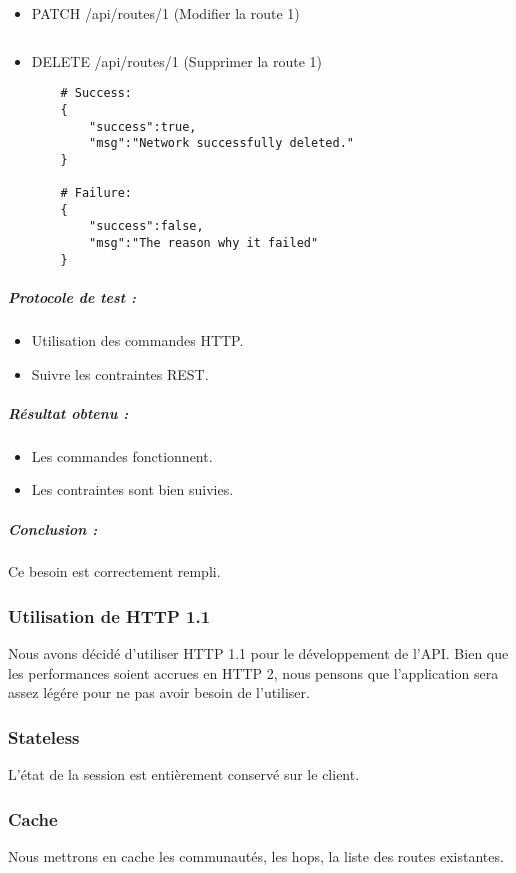 \begin{itemize}
    \item PATCH /api/routes/1 (Modifier la route 1)
    \begin{verbatim}
    \end{verbatim}

    \item DELETE /api/routes/1 (Supprimer la route 1)
    \begin{verbatim}
    # Success:
    {
        "success":true,
        "msg":"Network successfully deleted."
    }

    # Failure:
    {
        "success":false,
        "msg":"The reason why it failed"
    }
    \end{verbatim}

\end{itemize}

\subparagraph{Protocole de test :}
\begin{itemize}
    \item Utilisation des commandes HTTP.
    \item Suivre les contraintes REST.
\end{itemize}
\subparagraph{Résultat obtenu :}
    \begin{itemize}
    \item Les commandes fonctionnent.
    \item Les contraintes sont bien suivies.
\end{itemize}
\subparagraph{Conclusion :}Ce besoin est correctement rempli.

\subsubsection{Utilisation de HTTP 1.1}
Nous avons décidé d'utiliser HTTP 1.1 pour le développement de l'API. Bien que les performances soient accrues en HTTP 2, nous pensons que l'application sera assez légére pour ne pas avoir besoin de l'utiliser.



\subsubsection{Stateless}
L’état de la session est entièrement conservé sur le client.

\subsubsection{Cache}
Nous mettrons en cache les communautés, les hops, la liste des routes existantes.

